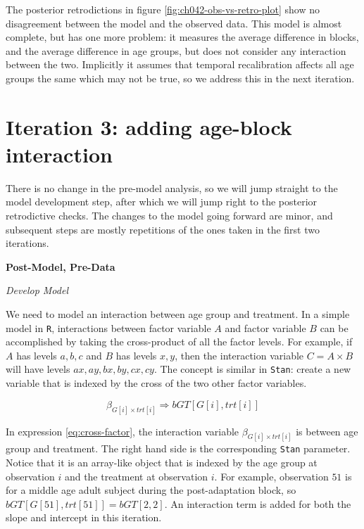 \documentclass[11pt, oneside, openany]{scrbook}
\begin{document}
The posterior retrodictions in figure \ref{fig:ch042-obs-vs-retro-plot} show no disagreement between the model and the observed data. This model is almost complete, but has one more problem: it measures the average difference in blocks, and the average difference in age groups, but does not consider any interaction between the two. Implicitly it assumes that temporal recalibration affects all age groups the same which may not be true, so we address this in the next iteration.

\hypertarget{iter3}{%
\section{Iteration 3: adding age-block interaction}\label{iter3}}

There is no change in the pre-model analysis, so we will jump straight to the model development step, after which we will jump right to the posterior retrodictive checks. The changes to the model going forward are minor, and subsequent steps are mostly repetitions of the ones taken in the first two iterations.

\textbf{Post-Model, Pre-Data}

\emph{Develop Model}

We need to model an interaction between age group and treatment. In a simple model in \texttt{R}, interactions between factor variable \(A\) and factor variable \(B\) can be accomplished by taking the cross-product of all the factor levels. For example, if \(A\) has levels \(a, b, c\) and \(B\) has levels \(x, y\), then the interaction variable \(C=A\times B\) will have levels \(ax, ay, bx, by, cx, cy\). The concept is similar in \texttt{Stan}: create a new variable that is indexed by the cross of the two other factor variables.

\begin{equation}
\beta_{G[i] \times trt[i]} \Longrightarrow bGT[G[i], trt[i]]
\label{eq:cross-factor}
\end{equation}

In expression \eqref{eq:cross-factor}, the interaction variable \(\beta_{G[i] \times trt[i]}\) is between age group and treatment. The right hand side is the corresponding \texttt{Stan} parameter. Notice that it is an array-like object that is indexed by the age group at observation \(i\) and the treatment at observation \(i\). For example, observation \(51\) is for a middle age adult subject during the post-adaptation block, so \(bGT[G[51], trt[51]] = bGT[2, 2]\). An interaction term is added for both the slope and intercept in this iteration.
\end{document}
